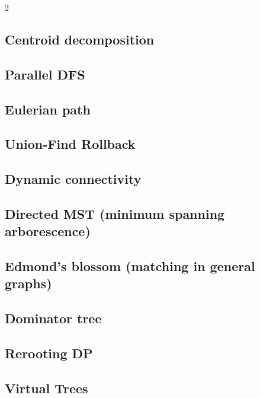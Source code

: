 \begin{multicols}{2}
\subsection{Centroid decomposition}

\subsection{Parallel DFS}

\subsection{Eulerian path}

\subsection{Union-Find Rollback}

\subsection{Dynamic connectivity}

\subsection{Directed MST (minimum spanning arborescence)}

\subsection{Edmond's blossom (matching in general graphs)}

\subsection{Dominator tree}

\subsection{Rerooting DP}

\subsection{Virtual Trees}


\end{multicols}

